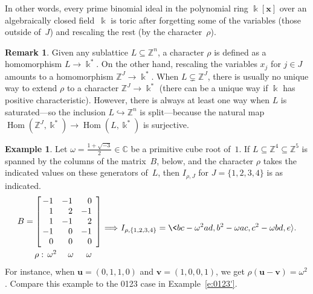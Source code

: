 \documentclass[12pt]{amsart}
\numberwithin{equation}{section}
\theoremstyle{definition}
\newtheorem{remark}[thm]{Remark}
\newtheorem{example}[thm]{Example}
\begin{document}
In other words, every prime binomial ideal in the polynomial ring
${\Bbbk}[{\mathbf{x}}]$ over an algebraically closed field~${\Bbbk}$ is toric after
forgetting some of the variables (those outside of~$J$) and rescaling
the rest (by the character~$\rho$).

\begin{remark}
Given any sublattice $L \subseteq {\mathbb{Z}}^n$, a character $\rho$ is
defined as a homomorphism $L \to {\Bbbk}^*$.  On the other hand, rescaling
the variables $x_j$ for $j \in J$ amounts to a homomorphism ${\mathbb{Z}}^J \to
{\Bbbk}^*$.  When $L \subsetneq {\mathbb{Z}}^J$, there is usually no unique way to
extend $\rho$ to a character ${\mathbb{Z}}^J \to {\Bbbk}^*$ (there can be a unique
way if ${\Bbbk}$ has positive characteristic).  However, there is always
at least one way when $L$ is saturated---so the inclusion $L {\hookrightarrow}
{\mathbb{Z}}^n$ is split---because the natural map $\operatorname{Hom}({\mathbb{Z}}^J,{\Bbbk}^*) \to
\operatorname{Hom}(L,{\Bbbk}^*)$ is surjective.
\end{remark}

\begin{example}
Let $\omega = \frac{1+\sqrt{-3}}2 \in {\mathbb{C}}$ be a primitive cube root
of~$1$.  If $L \subseteq {\mathbb{Z}}^4 \subseteq {\mathbb{Z}}^5$ is spanned by the
columns of the matrix~$B$, below, and the character $\rho$ takes the
indicated values on these generators of~$L$, then $I_{\rho,J}$ for $J
= \{1,2,3,4\}$ is as indicated.
$$\begin{array}{@{}r@{}}
  B =
  \left[
  \begin{array}{@{\,}rrr}
	-1 &-1 & 0 \\
	 1 & 2 &-1 \\
	 1 &-1 & 2 \\
	-1 & 0 &-1 \\
	 0 & 0 & 0
       \end{array}
  \right]
\\
\\[-2ex]
  \rho:
  \begin{array}{@{\,}rrr}
	\omega^2\ & \omega\ \,& \omega\ \
  \end{array}
\end{array}
\ {\Longrightarrow}\
I_{\rho,\{1,2,3,4\}} = \<bc-\omega^2ad,b^2-\omega ac,c^2-\omega bd,e{\rangle}.
$$
For instance, when ${\mathbf{u}} = (0,1,1,0)$ and ${\mathbf{v}} = (1,0,0,1)$, we get
$\rho({\mathbf{u}}-{\mathbf{v}}) = \omega^2$.  Compare this example to the 0123 case in
Example~\ref{e:0123'}.
\end{example}
\end{document}
